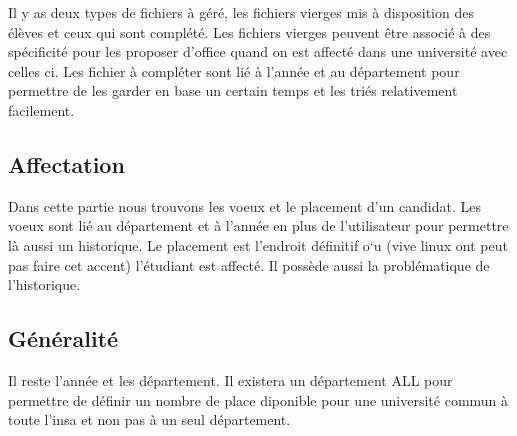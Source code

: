 Il y as deux types de fichiers à géré, les fichiers vierges mis à disposition des élèves et ceux qui sont complété.
Les fichiers vierges peuvent être associé à des spécificité pour les proposer d'office quand on est affecté dans une université avec celles ci.
Les fichier à compléter sont lié à l'année et au département pour permettre de les garder en base un certain temps et les triés relativement facilement.

\subsection{Affectation}

Dans cette partie nous trouvons les voeux et le placement d'un candidat. Les voeux sont lié au département et à l'année en plus de l'utilisateur pour permettre là aussi un historique.
Le placement est l'endroit définitif o`u (vive linux ont peut pas faire cet accent) l'étudiant est affecté. Il possède aussi la problématique de l'historique.

\subsection{Généralité}

Il reste l'année et les département. 
Il existera un département ALL pour permettre de définir un nombre de place diponible pour une université commun à toute l'insa et non pas à un seul département.

